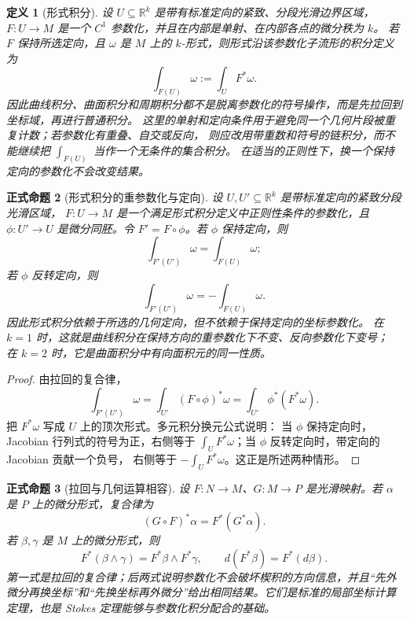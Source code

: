 \documentclass[UTF8,fontset=none,a4paper,11pt]{ctexart}
\theoremstyle{foundation-definition}
\newtheorem{definition}{定义}[section]
\theoremstyle{foundation-theorem}
\theoremstyle{foundation-proposition}
\newtheorem{proposition}[definition]{正式命题}
\theoremstyle{foundation-example}
\theoremstyle{foundation-remark}
\theoremstyle{foundation-theorem}
\begin{document}
\begin{definition}[形式积分]\label{def:form-integral}
设 \(U\subseteq\mathbb R^k\) 是带有标准定向的紧致、分段光滑边界区域，
\(F:U\to M\) 是一个 \(C^1\) 参数化，并且在内部是单射、在内部各点的微分秩为 \(k\)。
若 \(F\) 保持所选定向，且 \(\omega\) 是 \(M\) 上的 \(k\)-形式，则形式沿该参数化子流形的积分定义为
\[
\int_{F(U)}\omega:=\int_UF^*\omega.
\]
因此曲线积分、曲面积分和周期积分都不是脱离参数化的符号操作，而是先拉回到坐标域，再进行普通积分。
这里的单射和定向条件用于避免同一个几何片段被重复计数；若参数化有重叠、自交或反向，
则应改用带重数和符号的链积分，而不能继续把 \(\int_{F(U)}\) 当作一个无条件的集合积分。
在适当的正则性下，换一个保持定向的参数化不会改变结果。
\end{definition}

\begin{proposition}[形式积分的重参数化与定向]
\label{prop:form-integral-reparam}
设 \(U,U'\subseteq\mathbb R^k\) 是带标准定向的紧致分段光滑区域，
\(F:U\to M\) 是一个满足形式积分定义中正则性条件的参数化，且
\(\phi:U'\to U\) 是微分同胚。令 \(F'=F\circ\phi\)。若 \(\phi\) 保持定向，则
\[
\int_{F'(U')}\omega=\int_{F(U)}\omega;
\]
若 \(\phi\) 反转定向，则
\[
\int_{F'(U')}\omega=-\int_{F(U)}\omega.
\]
因此形式积分依赖于所选的几何定向，但不依赖于保持定向的坐标参数化。
在 \(k=1\) 时，这就是曲线积分在保持方向的重参数化下不变、反向参数化下变号；
在 \(k=2\) 时，它是曲面积分中有向面积元的同一性质。
\end{proposition}

\begin{proof}
由拉回的复合律，
\[
\int_{F'(U')}\omega
=\int_{U'}(F\circ\phi)^*\omega
=\int_{U'}\phi^*(F^*\omega).
\]
把 \(F^*\omega\) 写成 \(U\) 上的顶次形式。多元积分换元公式说明：
当 \(\phi\) 保持定向时，Jacobian 行列式的符号为正，右侧等于
\(\int_UF^*\omega\)；当 \(\phi\) 反转定向时，带定向的 Jacobian 贡献一个负号，
右侧等于 \(-\int_UF^*\omega\)。这正是所述两种情形。
\end{proof}

\begin{proposition}[拉回与几何运算相容]
设 \(F:N\to M\)、\(G:M\to P\) 是光滑映射。若 \(\alpha\) 是 \(P\) 上的微分形式，复合律为
\[
 (G\circ F)^*\alpha=F^*(G^*\alpha).
\]
若 \(\beta,\gamma\) 是 \(M\) 上的微分形式，则
\[
 F^*(\beta\wedge\gamma)=F^*\beta\wedge F^*\gamma,
 \qquad
 d(F^*\beta)=F^*(d\beta).
\]
第一式是拉回的复合律；后两式说明参数化不会破坏楔积的方向信息，并且“先外微分再换坐标”和“先换坐标再外微分”给出相同结果。它们是标准的局部坐标计算定理，也是 Stokes 定理能够与参数化积分配合的基础。
\end{proposition}
\end{document}

